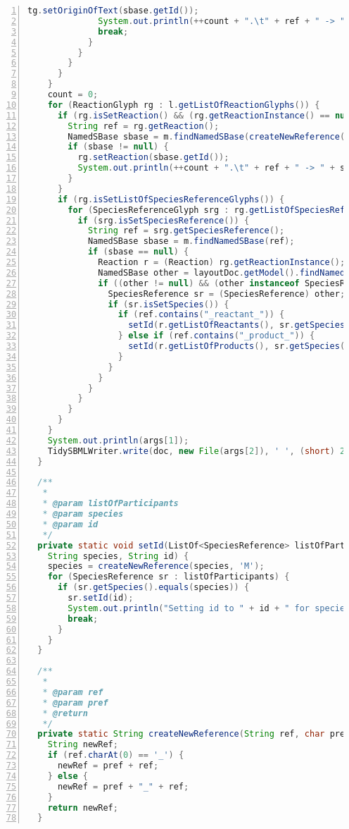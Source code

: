 \begin{lstlisting}[language=Java,numbers=left,captionpos=t,caption={Example script for merging an \SBML layout into a model},label={lst:modelMerge}]
              tg.setOriginOfText(sbase.getId());
              System.out.println(++count + ".\t" + ref + " -> " + sbase.getId());
              break;
            }
          }
        }
      }
    }
    count = 0;
    for (ReactionGlyph rg : l.getListOfReactionGlyphs()) {
      if (rg.isSetReaction() && (rg.getReactionInstance() == null)) {
        String ref = rg.getReaction();
        NamedSBase sbase = m.findNamedSBase(createNewReference(ref, 'R'));
        if (sbase != null) {
          rg.setReaction(sbase.getId());
          System.out.println(++count + ".\t" + ref + " -> " + sbase.getId());
        }
      }
      if (rg.isSetListOfSpeciesReferenceGlyphs()) {
        for (SpeciesReferenceGlyph srg : rg.getListOfSpeciesReferenceGlyphs()) {
          if (srg.isSetSpeciesReference()) {
            String ref = srg.getSpeciesReference();
            NamedSBase sbase = m.findNamedSBase(ref);
            if (sbase == null) {
              Reaction r = (Reaction) rg.getReactionInstance();
              NamedSBase other = layoutDoc.getModel().findNamedSBase(ref);
              if ((other != null) && (other instanceof SpeciesReference)) {
                SpeciesReference sr = (SpeciesReference) other;
                if (sr.isSetSpecies()) {
                  if (ref.contains("_reactant_")) {
                    setId(r.getListOfReactants(), sr.getSpecies(), ref);
                  } else if (ref.contains("_product_")) {
                    setId(r.getListOfProducts(), sr.getSpecies(), ref);
                  }
                }
              }
            }
          }
        }
      }
    }
    System.out.println(args[1]);
    TidySBMLWriter.write(doc, new File(args[2]), ' ', (short) 2);
  }

  /**
   *
   * @param listOfParticipants
   * @param species
   * @param id
   */
  private static void setId(ListOf<SpeciesReference> listOfParticipants,
    String species, String id) {
    species = createNewReference(species, 'M');
    for (SpeciesReference sr : listOfParticipants) {
      if (sr.getSpecies().equals(species)) {
        sr.setId(id);
        System.out.println("Setting id to " + id + " for speciesReference to " + species);
        break;
      }
    }
  }

  /**
   *
   * @param ref
   * @param pref
   * @return
   */
  private static String createNewReference(String ref, char pref) {
    String newRef;
    if (ref.charAt(0) == '_') {
      newRef = pref + ref;
    } else {
      newRef = pref + "_" + ref;
    }
    return newRef;
  }
\end{lstlisting}

